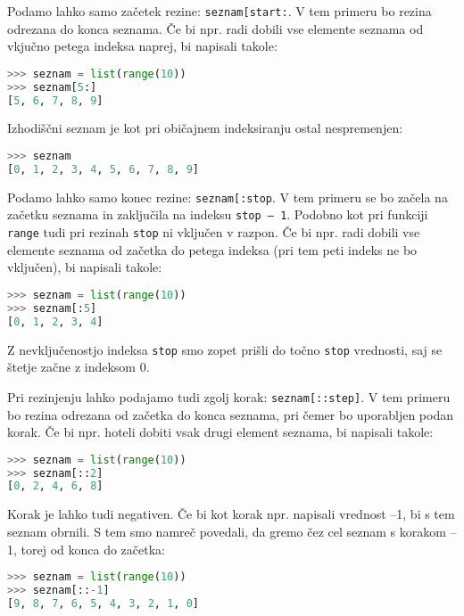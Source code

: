 Podamo lahko samo začetek rezine: \texttt{seznam[start:}.  V tem primeru bo rezina odrezana do konca seznama. Če bi npr. radi dobili vse elemente seznama od vkjučno petega indeksa naprej, bi napisali takole:
\begin{lstlisting}[language=Python]
>>> seznam = list(range(10))
>>> seznam[5:]
[5, 6, 7, 8, 9]
\end{lstlisting}
Izhodiščni seznam je kot pri običajnem indeksiranju ostal nespremenjen:
\begin{lstlisting}[language=Python]
>>> seznam
[0, 1, 2, 3, 4, 5, 6, 7, 8, 9]
\end{lstlisting}

Podamo lahko samo konec rezine: \texttt{seznam[:stop}.  V tem primeru se bo začela na začetku seznama in zaključila na indeksu \texttt{stop -- 1}. Podobno kot pri funkciji \texttt{range} tudi pri rezinah \texttt{stop} ni vključen v razpon. Če bi npr. radi dobili vse elemente seznama od začetka do petega indeksa (pri tem peti indeks ne bo vključen), bi napisali takole:
\begin{lstlisting}[language=Python]
>>> seznam = list(range(10))
>>> seznam[:5]
[0, 1, 2, 3, 4]
\end{lstlisting}
Z nevključenostjo indeksa \texttt{stop} smo zopet prišli do točno \texttt{stop} vrednosti, saj se štetje začne z indeksom 0. 

Pri rezinjenju lahko podajamo tudi zgolj korak: \texttt{seznam[::step]}. V tem primeru bo rezina odrezana od začetka do konca seznama, pri čemer bo uporabljen podan korak. Če bi npr. hoteli dobiti vsak drugi element seznama, bi napisali takole:
\begin{lstlisting}[language=Python]
>>> seznam = list(range(10))
>>> seznam[::2]
[0, 2, 4, 6, 8]
\end{lstlisting}
Korak je lahko tudi negativen. Če bi kot korak npr. napisali vrednost --1, bi s tem seznam obrnili. S tem smo namreč povedali, da gremo čez cel seznam s korakom --1, torej od konca do začetka:
\begin{lstlisting}[language=Python]
>>> seznam = list(range(10))
>>> seznam[::-1]
[9, 8, 7, 6, 5, 4, 3, 2, 1, 0]
\end{lstlisting}

